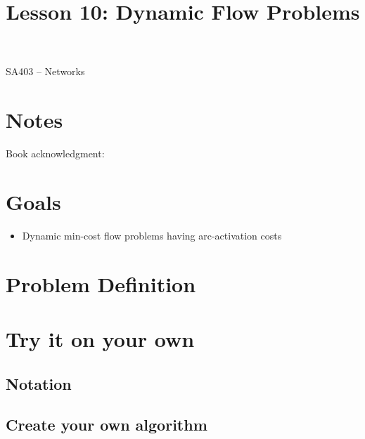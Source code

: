 \documentclass[12pt]{article}
\makeatletter
\theoremstyle{definition}
\newcommand{\graphbox}[5]%
{
\begin{tikzpicture}
     [>=latex,scale=#5]
     
     \draw [->,very thick] (#1, 0) -- (#2, 0) node[right] {$x$};
     \draw [->,very thick] (0, #3) -- (0, #4) node[above] {$y$};
     
     \draw[step=1cm,thick,dotted] (#1,#3) grid (#2,#4);
   \end{tikzpicture}
   }
\renewcommand{\maketitle}{
  \noindent SA403 -- Networks \\

  \begin{center}\Large{\textbf{\@title}}\end{center}
}
\makeatother
\begin{document}

\title{Lesson 10: Dynamic Flow Problems}


\maketitle


\section*{Notes}

Book acknowledgment:
\section*{Goals}
\begin{itemize}
\item Dynamic min-cost flow problems having arc-activation costs
\end{itemize}




\section{Problem Definition}


\section{Try it on your own}


\subsection{Notation}

\subsection{Create your own algorithm}
\end{document}
